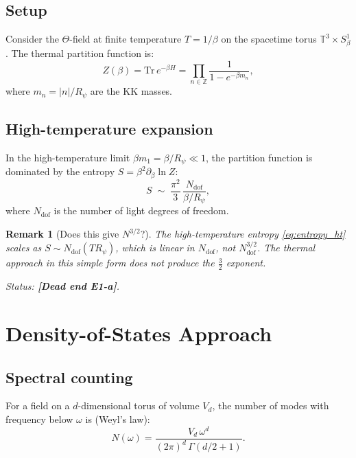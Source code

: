 \documentclass[11pt,a4paper]{article}
\newtheorem{remark}{Remark}
\begin{document}
\subsection{Setup}

Consider the $\Theta$-field at finite temperature $T = 1/\beta$ on the
spacetime torus $\mathbb{T}^3 \times S^1_\beta$.  The thermal partition
function is:
\begin{equation}
\label{eq:Z_thermal}
  Z(\beta) = \mathrm{Tr}\, e^{-\beta H}
  = \prod_{n \in \mathbb{Z}} \frac{1}{1 - e^{-\beta m_n}},
\end{equation}
where $m_n = |n|/R_\psi$ are the KK masses.

\subsection{High-temperature expansion}

In the high-temperature limit $\beta m_1 = \beta/R_\psi \ll 1$, the
partition function is dominated by the entropy $S = \beta^2 \partial_\beta \ln Z$:
\begin{equation}
\label{eq:entropy_ht}
  S \;\sim\; \frac{\pi^2}{3}\, \frac{N_{\mathrm{dof}}}{\beta/R_\psi},
\end{equation}
where $N_{\mathrm{dof}}$ is the number of light degrees of freedom.

\begin{remark}[Does this give $N^{3/2}$?]
  The high-temperature entropy \eqref{eq:entropy_ht} scales as
  $S \sim N_{\mathrm{dof}} (T R_\psi)$, which is linear in $N_{\mathrm{dof}}$,
  not $N_{\mathrm{dof}}^{3/2}$.  The thermal approach in this simple form
  does \emph{not} produce the $\tfrac{3}{2}$ exponent.

  Status: \textbf{[Dead end E1-a]}.
\end{remark}

\section{Density-of-States Approach}
\label{sec:dos}

\subsection{Spectral counting}

For a field on a $d$-dimensional torus of volume $V_d$, the number of modes
with frequency below $\omega$ is (Weyl's law):
\begin{equation}
\label{eq:weyl}
  N(\omega) = \frac{V_d\,\omega^d}{(2\pi)^d\,\Gamma(d/2+1)}.
\end{equation}
\end{document}
